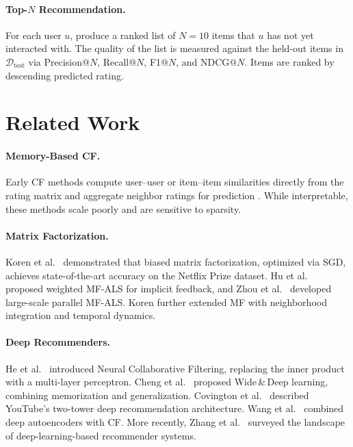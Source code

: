 \documentclass[11pt]{article}
\begin{document}
\paragraph{Top-$N$ Recommendation.}
For each user $u$, produce a ranked list of $N=10$ items that $u$ has not yet interacted with.
The quality of the list is measured against the held-out items in $\mathcal{D}_\text{test}$ via Precision@$N$, Recall@$N$, F1@$N$, and NDCG@$N$.
Items are ranked by descending predicted rating.


\section{Related Work}

\paragraph{Memory-Based CF.}
Early CF methods compute user--user or item--item similarities directly from the rating matrix and aggregate neighbor ratings for prediction \cite{resnick1994grouplens,sarwar2001item}.
While interpretable, these methods scale poorly and are sensitive to sparsity.

\paragraph{Matrix Factorization.}
Koren et al.\ \cite{koren2009matrix} demonstrated that biased matrix factorization, optimized via SGD, achieves state-of-the-art accuracy on the Netflix Prize dataset.
Hu et al.\ \cite{hu2008collaborative} proposed weighted MF-ALS for implicit feedback, and Zhou et al.\ \cite{zhou2008large} developed large-scale parallel MF-ALS.
Koren \cite{koren2008factorization} further extended MF with neighborhood integration and temporal dynamics.

\paragraph{Deep Recommenders.}
He et al.\ \cite{he2017neural} introduced Neural Collaborative Filtering, replacing the inner product with a multi-layer perceptron.
Cheng et al.\ \cite{cheng2016wide} proposed Wide\,\&\,Deep learning, combining memorization and generalization.
Covington et al.\ \cite{covington2016deep} described YouTube's two-tower deep recommendation architecture.
Wang et al.\ \cite{wang2015collaborative} combined deep autoencoders with CF.
More recently, Zhang et al.\ \cite{zhang2019deep} surveyed the landscape of deep-learning-based recommender systems.
\end{document}
